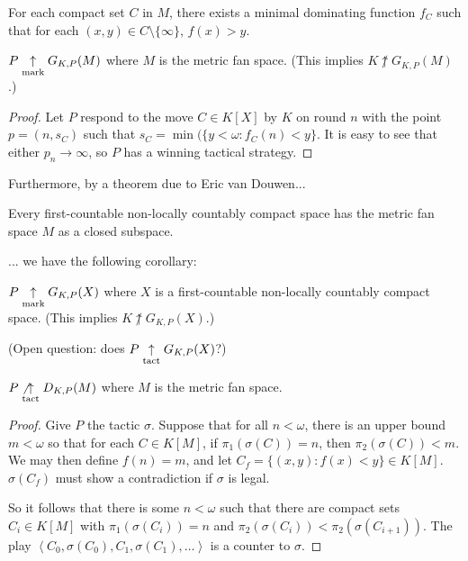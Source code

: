 \begin{proposition}
For each compact set $C$ in $M$, there exists a minimal dominating function $f_C$ such that for each $(x,y)\in C\setminus\{\infty\}$, $f(x)> y$.
\end{proposition}

\begin{lemma}
$P \underset{\text{mark}}{\uparrow} G_{K,P}(M)$ where $M$ is the metric fan space. (This implies $K\not\uparrow G_{K,P}(M)$.)
\end{lemma}

\begin{proof}
Let $P$ respond to the move $C\in K[X]$ by $K$ on round $n$ with the point $p=(n,s_C)$ such that $s_C = \min(\{y<\omega : f_C(n) < y\}$. It is easy to see that either $p_n\rightarrow \infty$, so $P$ has a winning tactical strategy.
\end{proof}

Furthermore, by a theorem due to Eric van Douwen...

\begin{theorem}
Every first-countable non-locally countably compact space has the metric fan space $M$ as a closed subspace.
\end{theorem}

... we have the following corollary:

\begin{corollary}
$P \underset{\text{mark}}{\uparrow} G_{K,P}(X)$ where $X$ is a first-countable non-locally countably compact space. (This implies $K\not\uparrow G_{K,P}(X)$.)
\end{corollary}

(Open question: does $P \underset{\text{tact}}{\uparrow} G_{K,P}(X)$?)

\begin{theorem}
$P \not\underset{\text{tact}}{\uparrow} D_{K,P}(M)$ where $M$ is the metric fan space.
\end{theorem}

\begin{proof}
Give $P$ the tactic $\sigma$. Suppose that for all $n<\omega$, there is an upper bound $m<\omega$ so that for each $C \in K[M]$, if $\pi_1(\sigma(C))=n$, then $\pi_2(\sigma(C))<m$. We may then define $f(n)=m$, and let $C_f=\{(x,y):f(x)<y\}\in K[M]$. $\sigma(C_f)$ must show a contradiction if $\sigma$ is legal.

So it follows that there is some $n<\omega$ such that there are compact sets $C_i\in K[M]$ with $\pi_1(\sigma(C_i))=n$ and $\pi_2(\sigma(C_i))<\pi_2(\sigma(C_{i+1}))$. The play $\left<C_0,\sigma(C_0),C_1,\sigma(C_1),\dots\right>$ is a counter to $\sigma$.
\end{proof}

